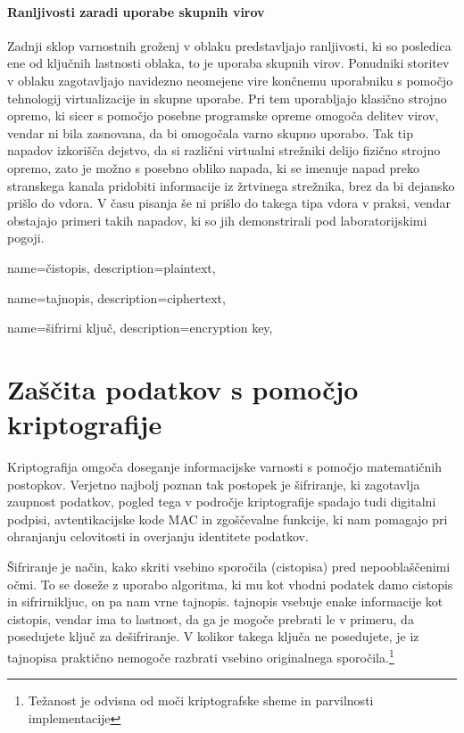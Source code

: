 \documentclass[12pt,a4paper,openany]{book}
\begin{document}
\subsubsection{Ranljivosti zaradi uporabe skupnih virov}
Zadnji sklop varnostnih groženj v oblaku predstavljajo ranljivosti, ki so posledica ene od ključnih lastnosti oblaka, to je uporaba skupnih virov. Ponudniki storitev v oblaku zagotavljajo navidezno neomejene vire končnemu uporabniku s pomočjo tehnologij virtualizacije in skupne uporabe. Pri tem uporabljajo klasično strojno opremo, ki sicer s pomočjo posebne programske opreme omogoča delitev virov, vendar ni bila zasnovana, da bi omogočala varno skupno uporabo. Tak tip napadov izkorišča dejstvo, da si različni virtualni strežniki delijo fizično strojno opremo, zato je možno s posebno obliko napada, ki se imenuje napad preko stranskega kanala pridobiti informacije iz žrtvinega strežnika, brez da bi dejansko prišlo do vdora. V času pisanja še ni prišlo do takega tipa vdora v praksi, vendar obstajajo primeri takih napadov, ki so jih demonstrirali pod laboratorijskimi pogoji.










{
  name=čistopis,
  description={plaintext},
}


{
  name=tajnopis,
  description={ciphertext},
}

{
  name=šifrirni ključ,
  description={encryption key},
}


\chapter{Zaščita podatkov s pomočjo kriptografije}

Kriptografija omgoča doseganje informacijske varnosti s pomočjo matematičnih postopkov. Verjetno najbolj poznan tak postopek je šifriranje, ki zagotavlja zaupnost podatkov, pogled tega v področje kriptografije spadajo tudi digitalni podpisi, avtentikacijske kode MAC in zgoščevalne funkcije, ki nam pomagajo pri ohranjanju celovitosti in overjanju identitete podatkov.

Šifriranje je način, kako skriti vsebino sporočila (\gls{cistopis}a) pred nepooblaščenimi očmi. To se doseže z uporabo algoritma, ki mu kot vhodni podatek damo \gls{cistopis} in \gls{sifrirnikljuc}, on pa nam vrne \gls{tajnopis}. \Gls{tajnopis} vsebuje enake informacije kot \gls{cistopis}, vendar ima to lastnost, da ga je mogoče prebrati le v primeru, da posedujete ključ za dešifriranje. V kolikor takega ključa ne posedujete, je iz \gls{tajnopis}a praktično nemogoče razbrati vsebino originalnega sporočila.\footnote{Težanost je odvisna od moči kriptografske sheme in parvilnosti implementacije}
\end{document}
